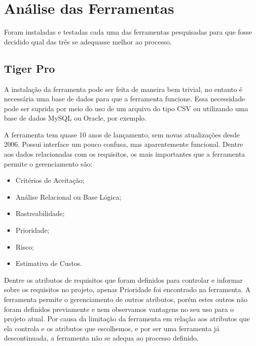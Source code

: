 \section[Análise das Ferramentas]{Análise das Ferramentas}
Foram instaladas e testadas cada uma das ferramentas pesquisadas para que fosse decidido qual das três se adequasse melhor ao processo.

\subsection{Tiger Pro}
A instalação da ferramenta pode ser feita de maneira bem trivial, no entanto é necessária uma base de dados para que a ferramenta funcione. Essa necessidade pode ser suprida por meio do uso de um arquivo do tipo CSV ou utilizando uma base de dados MySQL ou Oracle, por exemplo.

A ferramenta tem quase 10 anos de lançamento, sem novas atualizações desde 2006. Possui interface um pouco confusa, mas aparentemente funcional. Dentre aos dados relacionadas com os requisitos, os mais importantes que a ferramenta permite o gerenciamento são:
\begin{itemize}
  \item Critérios de Aceitação;
  \item Análise Relacional ou Base Lógica;
  \item Rastreabilidade;
  \item Prioridade;
  \item Risco;
  \item Estimativa de Custos.
\end{itemize}

Dentre os atributos de requisitos que foram definidos para controlar e informar sobre os requisitos no projeto, apenas Prioridade foi encontrado na ferramenta.
A ferramenta permite o gerenciamento de outros atributos, porém estes outros não foram definidos previamente e nem observamos vantagens no seu uso para o projeto atual. 
Por causa da limitação da ferramenta em relação aos atributos que ela controla e os atributos que escolhemos, e por ser uma ferramenta já descontinuada, a ferramenta não 
se adequa ao processo definido.

